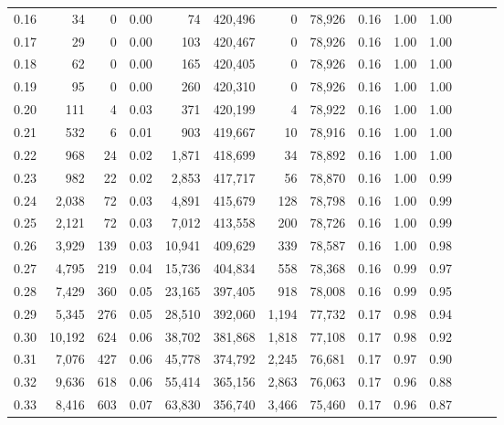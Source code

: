 \begin{tabular}{rrrrrrrrrrrrrr}
0.16 &      34 &      0 &  0.00 &       74 &  420,496 &       0 &  78,926 &  0.16 &  1.00 &      1.00 \\
0.17 &      29 &      0 &  0.00 &      103 &  420,467 &       0 &  78,926 &  0.16 &  1.00 &      1.00 \\
0.18 &      62 &      0 &  0.00 &      165 &  420,405 &       0 &  78,926 &  0.16 &  1.00 &      1.00 \\
0.19 &      95 &      0 &  0.00 &      260 &  420,310 &       0 &  78,926 &  0.16 &  1.00 &      1.00 \\
0.20 &     111 &      4 &  0.03 &      371 &  420,199 &       4 &  78,922 &  0.16 &  1.00 &      1.00 \\
0.21 &     532 &      6 &  0.01 &      903 &  419,667 &      10 &  78,916 &  0.16 &  1.00 &      1.00 \\
0.22 &     968 &     24 &  0.02 &    1,871 &  418,699 &      34 &  78,892 &  0.16 &  1.00 &      1.00 \\
0.23 &     982 &     22 &  0.02 &    2,853 &  417,717 &      56 &  78,870 &  0.16 &  1.00 &      0.99 \\
0.24 &   2,038 &     72 &  0.03 &    4,891 &  415,679 &     128 &  78,798 &  0.16 &  1.00 &      0.99 \\
0.25 &   2,121 &     72 &  0.03 &    7,012 &  413,558 &     200 &  78,726 &  0.16 &  1.00 &      0.99 \\
0.26 &   3,929 &    139 &  0.03 &   10,941 &  409,629 &     339 &  78,587 &  0.16 &  1.00 &      0.98 \\
0.27 &   4,795 &    219 &  0.04 &   15,736 &  404,834 &     558 &  78,368 &  0.16 &  0.99 &      0.97 \\
0.28 &   7,429 &    360 &  0.05 &   23,165 &  397,405 &     918 &  78,008 &  0.16 &  0.99 &      0.95 \\
0.29 &   5,345 &    276 &  0.05 &   28,510 &  392,060 &   1,194 &  77,732 &  0.17 &  0.98 &      0.94 \\
0.30 &  10,192 &    624 &  0.06 &   38,702 &  381,868 &   1,818 &  77,108 &  0.17 &  0.98 &      0.92 \\
0.31 &   7,076 &    427 &  0.06 &   45,778 &  374,792 &   2,245 &  76,681 &  0.17 &  0.97 &      0.90 \\
0.32 &   9,636 &    618 &  0.06 &   55,414 &  365,156 &   2,863 &  76,063 &  0.17 &  0.96 &      0.88 \\
0.33 &   8,416 &    603 &  0.07 &   63,830 &  356,740 &   3,466 &  75,460 &  0.17 &  0.96 &      0.87 \\

\end{tabular}
